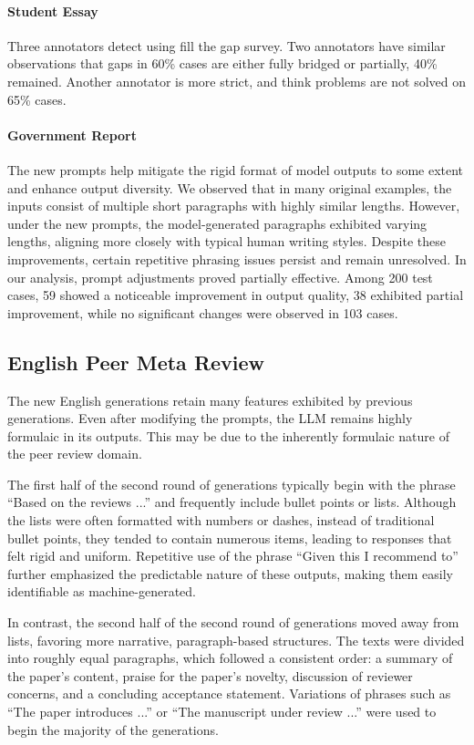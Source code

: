 \paragraph{Student Essay}
Three annotators detect using fill the gap survey. Two annotators have similar observations that gaps in 60\% cases are either fully bridged or partially, 40\% remained. Another annotator is more strict, and think problems are not solved on 65\% cases.  

\paragraph{Government Report} 
The new prompts help mitigate the rigid format of model outputs to some extent and enhance output diversity. We observed that in many original examples, the inputs consist of multiple short paragraphs with highly similar lengths. However, under the new prompts, the model-generated paragraphs exhibited varying lengths, aligning more closely with typical human writing styles. Despite these improvements, certain repetitive phrasing issues persist and remain unresolved. In our analysis, prompt adjustments proved partially effective. Among 200 test cases, 59 showed a noticeable improvement in output quality, 38 exhibited partial improvement, while no significant changes were observed in 103 cases.



\subsection{English Peer Meta Review}
The new English generations retain many features exhibited by previous generations. Even after modifying the prompts, the LLM remains highly formulaic in its outputs. This may be due to the inherently formulaic nature of the peer review domain.

The first half of the second round of generations typically begin with the phrase ``Based on the reviews ...'' and frequently include bullet points or lists. Although the lists were often formatted with numbers or dashes, instead of traditional bullet points, they tended to contain numerous items, leading to responses that felt rigid and uniform. Repetitive use of the phrase ``Given this I recommend to'' further emphasized the predictable nature of these outputs, making them easily identifiable as machine-generated.

In contrast, the second half of the second round of generations moved away from lists, favoring more narrative, paragraph-based structures. The texts were divided into roughly equal paragraphs, which followed a consistent order: a summary of the paper's content, praise for the paper’s novelty, discussion of reviewer concerns, and a concluding acceptance statement. Variations of phrases such as ``The paper introduces ...'' or ``The manuscript under review ...'' were used to begin the majority of the generations.

